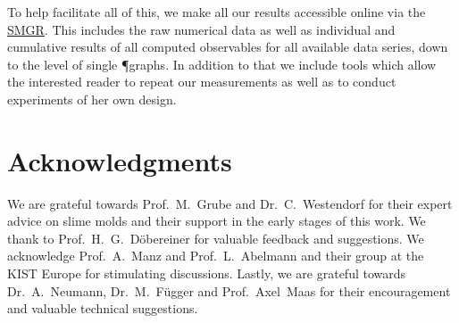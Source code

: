 			To help facilitate all of this, we make all our results accessible online via the \href{http://smgr.mpi-inf.mpg.de}{SMGR}. This includes the raw numerical data as well as individual and cumulative results of all computed observables for all available data series, down to the level of single \P graphs. In addition to that we include tools which allow the interested reader to repeat our measurements as well as to conduct experiments of her own design.

	\section{Acknowledgments}

		We are grateful towards Prof.~M.~Grube and Dr.~C.~Westendorf for their expert advice on slime molds and their support in the early stages of this work. We thank to Prof.~H.~G.~D\"obereiner for valuable feedback and suggestions. We acknowledge Prof.~A.~Manz and Prof.~L.~Abelmann and their group at the KIST Europe for stimulating discussions. Lastly, we are grateful towards Dr.~A.~Neumann, Dr.~M.~F\"ugger and Prof.~Axel~Maas for their encouragement and valuable technical suggestions.

